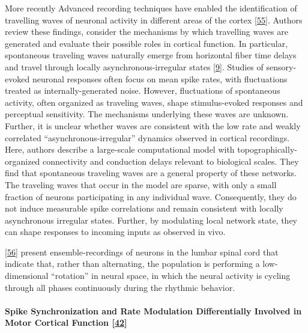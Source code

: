 More recently Advanced recording techniques have enabled the identification of travelling waves of neuronal activity in different areas of the cortex {[}\protect\hyperlink{ref-vsKvZJ82}{55}{]}. Authors review these findings, consider the mechanisms by which travelling waves are generated and evaluate their possible roles in cortical function. In particular, spontaneous traveling waves naturally emerge from horizontal fiber time delays and travel through locally asynchronous-irregular states {[}\protect\hyperlink{ref-BNK6T5Uk}{9}{]}. Studies of sensory-evoked neuronal responses often focus on mean spike rates, with fluctuations treated as internally-generated noise. However, fluctuations of spontaneous activity, often organized as traveling waves, shape stimulus-evoked responses and perceptual sensitivity. The mechanisms underlying these waves are unknown. Further, it is unclear whether waves are consistent with the low rate and weakly correlated ``asynchronous-irregular'' dynamics observed in cortical recordings. Here, authors describe a large-scale computational model with topographically-organized connectivity and conduction delays relevant to biological scales. They find that spontaneous traveling waves are a general property of these networks. The traveling waves that occur in the model are sparse, with only a small fraction of neurons participating in any individual wave. Consequently, they do not induce measurable spike correlations and remain consistent with locally asynchronous irregular states. Further, by modulating local network state, they can shape responses to incoming inputs as observed in vivo.

{[}\protect\hyperlink{ref-17EU8fPBv}{56}{]} present ensemble-recordings of neurons in the lumbar spinal cord that indicate that, rather than alternating, the population is performing a low-dimensional ``rotation'' in neural space, in which the neural activity is cycling through all phases continuously during the rhythmic behavior.

\hypertarget{spike-synchronization-and-rate-modulation-differentially-involved-in-motor-cortical-function-doi10.1126science.278.5345.1950}{%
\paragraph{\texorpdfstring{Spike Synchronization and Rate Modulation Differentially Involved in Motor Cortical Function {[}\protect\hyperlink{ref-wVZpQvSk}{42}{]}}{Spike Synchronization and Rate Modulation Differentially Involved in Motor Cortical Function {[}42{]}}}\label{spike-synchronization-and-rate-modulation-differentially-involved-in-motor-cortical-function-doi10.1126science.278.5345.1950}}

